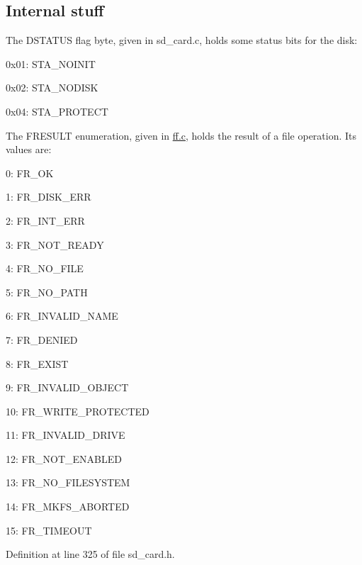 \hypertarget{classsd__card_sd_int_comp}{}\subsection{Internal stuff}\label{classsd__card_sd_int_comp}
The D\-S\-T\-A\-T\-U\-S flag byte, given in sd\-\_\-card.\-c, holds some status bits for the disk\-: \begin{DoxyItemize}
\item 0x01\-: S\-T\-A\-\_\-\-N\-O\-I\-N\-I\-T \item 0x02\-: S\-T\-A\-\_\-\-N\-O\-D\-I\-S\-K \item 0x04\-: S\-T\-A\-\_\-\-P\-R\-O\-T\-E\-C\-T\end{DoxyItemize}
The F\-R\-E\-S\-U\-L\-T enumeration, given in \hyperlink{ff_8c_source}{ff.\-c}, holds the result of a file operation. Its values are\-: \begin{DoxyItemize}
\item 0\-: F\-R\-\_\-\-O\-K \item 1\-: F\-R\-\_\-\-D\-I\-S\-K\-\_\-\-E\-R\-R \item 2\-: F\-R\-\_\-\-I\-N\-T\-\_\-\-E\-R\-R \item 3\-: F\-R\-\_\-\-N\-O\-T\-\_\-\-R\-E\-A\-D\-Y \item 4\-: F\-R\-\_\-\-N\-O\-\_\-\-F\-I\-L\-E \item 5\-: F\-R\-\_\-\-N\-O\-\_\-\-P\-A\-T\-H \item 6\-: F\-R\-\_\-\-I\-N\-V\-A\-L\-I\-D\-\_\-\-N\-A\-M\-E \item 7\-: F\-R\-\_\-\-D\-E\-N\-I\-E\-D \item 8\-: F\-R\-\_\-\-E\-X\-I\-S\-T \item 9\-: F\-R\-\_\-\-I\-N\-V\-A\-L\-I\-D\-\_\-\-O\-B\-J\-E\-C\-T \item 10\-: F\-R\-\_\-\-W\-R\-I\-T\-E\-\_\-\-P\-R\-O\-T\-E\-C\-T\-E\-D \item 11\-: F\-R\-\_\-\-I\-N\-V\-A\-L\-I\-D\-\_\-\-D\-R\-I\-V\-E \item 12\-: F\-R\-\_\-\-N\-O\-T\-\_\-\-E\-N\-A\-B\-L\-E\-D \item 13\-: F\-R\-\_\-\-N\-O\-\_\-\-F\-I\-L\-E\-S\-Y\-S\-T\-E\-M \item 14\-: F\-R\-\_\-\-M\-K\-F\-S\-\_\-\-A\-B\-O\-R\-T\-E\-D \item 15\-: F\-R\-\_\-\-T\-I\-M\-E\-O\-U\-T \end{DoxyItemize}


Definition at line 325 of file sd\-\_\-card.\-h.



